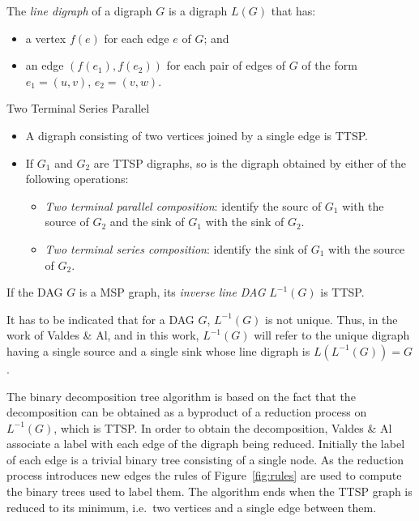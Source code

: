 \begin{mydef}
The \emph{line digraph} of a digraph $G$ is a digraph $L(G)$ that has:
\begin{itemize}
\item a vertex $f(e)$ for each edge $e$ of $G$; and
\item an edge $(f(e_1),f(e_2))$ for each pair of edges of $G$ of the form $e_1=(u,v)$, $e_2=(v,w)$.
\end{itemize}
\end{mydef}

\begin{mydef}Two Terminal Series Parallel
\begin{itemize}
\item A digraph consisting of two vertices joined by a single edge is TTSP.
\item If $G_1$ and $G_2$ are TTSP digraphs, so is the digraph obtained by either of the following operations:
\begin{itemize}
\item \emph{Two terminal parallel composition}: identify the sourc of $G_1$ with the source of $G_2$ and the sink of $G_1$ with the sink of $G_2$.
\item \emph{Two terminal series composition}: identify the sink of $G_1$ with the source of $G_2$.
\end{itemize}
\end{itemize}
\end{mydef}

\begin{myth}
If the DAG $G$ is a MSP graph, its \emph{inverse line DAG} $L^{-1}(G)$ is TTSP.
\end{myth}

It has to be indicated that for a DAG $G$, $L^{-1}(G)$ is not unique. Thus, in the work of Valdes \& Al, and in this work, $L^{-1}(G)$ will refer to the unique digraph having a single source and a single sink whose line digraph is $L(L^{-1}(G))=G$.

The binary decomposition tree algorithm is based on the fact that the decomposition can be obtained as a byproduct of a reduction process on $L^{-1}(G)$, which is TTSP. In order to obtain the decomposition, Valdes \& Al associate a label with each edge of the digraph being reduced. Initially the label of each edge is a trivial binary tree consisting of a single node. As the reduction process introduces new edges the rules of Figure~\ref{fig:rules} are used to compute the binary trees used to label them. The algorithm ends when the TTSP graph is reduced to its minimum, i.e.\ two vertices and a single edge between them.

